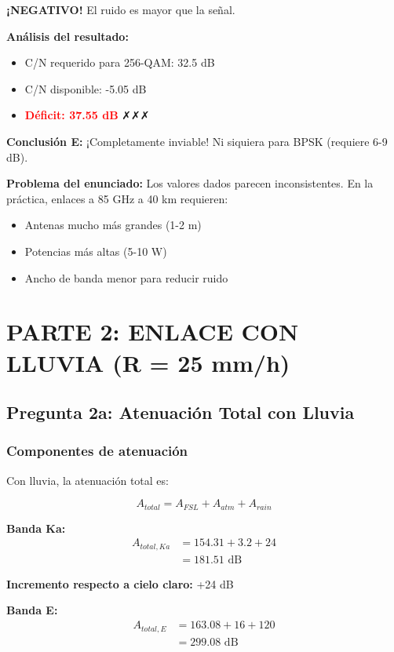 \documentclass[a4paper,10pt]{article}
\begin{document}
\textbf{¡NEGATIVO!} El ruido es mayor que la señal.

\textbf{Análisis del resultado:}
\begin{itemize}
    \item C/N requerido para 256-QAM: 32.5 dB
    \item C/N disponible: -5.05 dB
    \item \textcolor{red}{\textbf{Déficit: 37.55 dB}} ✗✗✗
\end{itemize}

\textbf{Conclusión E:} ¡Completamente inviable! Ni siquiera para BPSK (requiere 6-9 dB).

\textbf{Problema del enunciado:} Los valores dados parecen inconsistentes. En la práctica, enlaces a 85 GHz a 40 km requieren:
\begin{itemize}
    \item Antenas mucho más grandes (1-2 m)
    \item Potencias más altas (5-10 W)
    \item Ancho de banda menor para reducir ruido
\end{itemize}

\newpage
\section{PARTE 2: ENLACE CON LLUVIA (R = 25 mm/h)}

\subsection{Pregunta 2a: Atenuación Total con Lluvia}

\subsubsection{Componentes de atenuación}

Con lluvia, la atenuación total es:

$$A_{total} = A_{FSL} + A_{atm} + A_{rain}$$

\textbf{Banda Ka:}
\begin{align*}
A_{total,Ka} &= 154.31 + 3.2 + 24\\
&= \boxed{181.51 \text{ dB}}
\end{align*}

\textbf{Incremento respecto a cielo claro:} +24 dB

\textbf{Banda E:}
\begin{align*}
A_{total,E} &= 163.08 + 16 + 120\\
&= \boxed{299.08 \text{ dB}}
\end{align*}
\end{document}
